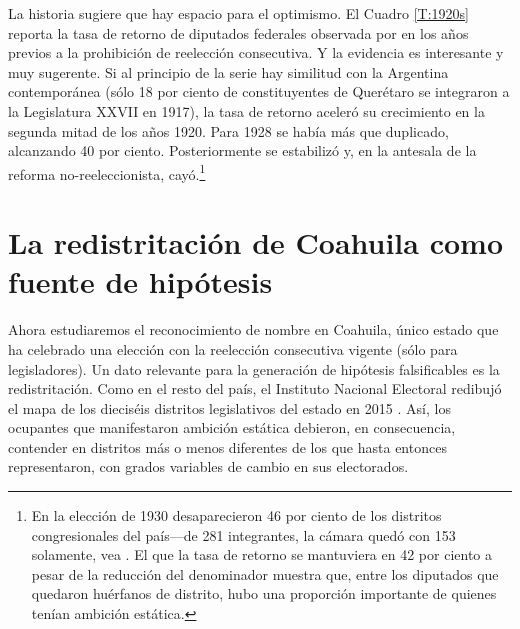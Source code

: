 \documentclass[letter,12pt]{article}
\begin{document}
La historia sugiere que hay espacio para el optimismo. El Cuadro \ref{T:1920s} reporta la tasa de retorno de diputados federales observada por \citet{godoy.reeleccion.2014} en los años previos a la prohibición de reelección consecutiva. Y la evidencia es interesante y muy sugerente. Si al principio de la serie hay similitud con la Argentina contemporánea (s\'olo 18 por ciento de constituyentes de Querétaro se integraron a la Legislatura XXVII en 1917), la tasa de retorno aceleró su crecimiento en la segunda mitad de los años 1920. Para 1928 se había más que duplicado, alcanzando 40 por ciento. Posteriormente se estabilizó y, en la antesala de la reforma no-reeleccionista, cayó.\footnote{En la elección de 1930 desaparecieron 46 por ciento de los distritos congresionales del país---de 281 integrantes, la cámara quedó con 153 solamente, vea \citet[][:23]{godoy.reeleccion.2014}. El que la tasa de retorno se mantuviera en 42 por ciento a pesar de la reducción del denominador muestra que, entre los diputados que quedaron huérfanos de distrito, hubo una proporción importante de quienes tenían ambición estática.} 



\section{La redistritación de Coahuila como fuente de hipótesis}

\noindent Ahora estudiaremos el reconocimiento de nombre en Coahuila, único estado que ha celebrado una elección con la reelección consecutiva vigente (sólo para legisladores). Un dato relevante para la generación de hipótesis falsificables es la redistritación. Como en el resto del país, el Instituto Nacional Electoral redibujó el mapa de los dieciséis distritos legislativos del estado en 2015 \citep{trelles.etalDatosabiertos.pyg.2016}. Así, los ocupantes que manifestaron ambición estática debieron, en consecuencia, contender en distritos más o menos diferentes de los que hasta entonces representaron, con grados variables de cambio en sus electorados.
\end{document}
